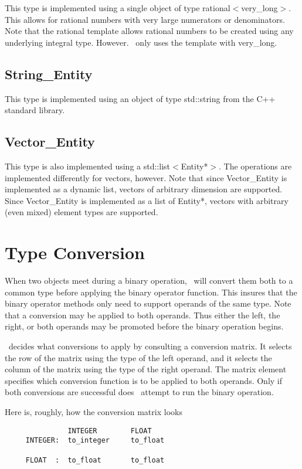 \documentclass{report}
\begin{document}
This type is implemented using a single object of type rational$<$very\_long$>$. This allows for
rational numbers with very large numerators or denominators. Note that the rational template
allows rational numbers to be created using any underlying integral type. However. \CLAC\ only
uses the template with very\_long.

\subsection{String\_Entity}

This type is implemented using an object of type std::string from the C++ standard library.

\subsection{Vector\_Entity}

This type is also implemented using a std::list$<$Entity*$>$. The operations are implemented
differently for vectors, however. Note that since Vector\_Entity is implemented as a dynamic
list, vectors of arbitrary dimension are supported. Since Vector\_Entity is implemented as a
list of Entity*, vectors with arbitrary (even mixed) element types are supported.

\section{Type Conversion}

When two objects meet during a binary operation, \CLAC\ will convert them both to a common type
before applying the binary operator function. This insures that the binary operator methods only
need to support operands of the same type. Note that a conversion may be applied to both
operands. Thus either the left, the right, or both operands may be promoted before the binary
operation begins.

\CLAC\ decides what conversions to apply by consulting a conversion matrix. It selects the row
of the matrix using the type of the left operand, and it selects the column of the matrix using
the type of the right operand. The matrix element specifies which conversion function is to be
applied to both operands. Only if both conversions are successful does \CLAC\ attempt to run the
binary operation.

Here is, roughly, how the conversion matrix looks

%
%
\begin{verbatim}
               INTEGER        FLOAT
     INTEGER:  to_integer     to_float

     FLOAT  :  to_float       to_float
\end{verbatim}
\end{document}
